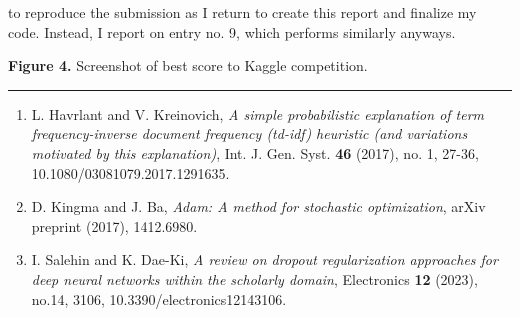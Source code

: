 \documentclass[11pt]{article}
\newcommand{\1}[1]{\mathbbm{1}_{#1}}
\begin{document}
to reproduce the submission as I return to create this report and finalize my code. Instead, I report on entry no. 9, which performs similarly anyways.
 \begin{center}
\end{center}
\begin{center}
    \begin{minipage}{\dimexpr\paperwidth-5cm}
        {\bf Figure 4.} Screenshot of best score to Kaggle competition.
    \end{minipage}
\end{center}
\hrule
\vspace{10pt}
    \begin{enumerate}
        \item L. Havrlant and V. Kreinovich, {\it A simple probabilistic explanation of term frequency-inverse document frequency (td-idf) heuristic (and variations motivated by this explanation)}, Int. J. Gen. Syst. {\bf 46} (2017), no. 1, 27-36, 10.1080/03081079.2017.1291635.
        \item D. Kingma and J. Ba, {\it Adam: A method for stochastic optimization}, arXiv preprint (2017), 1412.6980. 
        \item I. Salehin and K. Dae-Ki, {\it A review on dropout regularization approaches for deep neural networks within the scholarly domain}, Electronics {\bf 12} (2023), no.14, 3106, 10.3390/electronics12143106.
    \end{enumerate}
\end{document}

